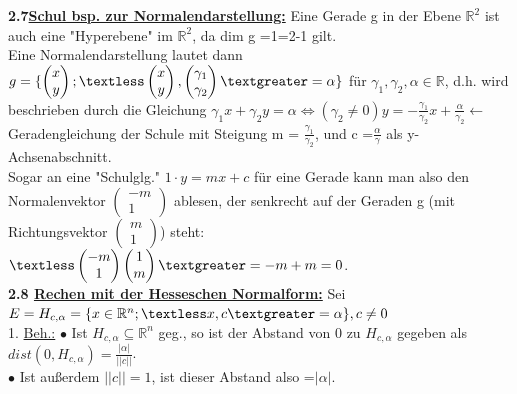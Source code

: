 \documentclass[]{scrartcl}
\begin{document}
\textbf{2.7\underline{Schul bsp. zur Normalendarstellung:}} Eine Gerade g in 
der Ebene $\mathbb{R}^2$ ist auch eine "Hyperebene" im $\mathbb{R}^2$, da dim g 
=1=2-1 gilt.\\
Eine Normalendarstellung lautet dann $g=\{\begin{pmatrix}
		x\\
		y
\end{pmatrix} ;\textless \begin{pmatrix}
x\\
y
\end{pmatrix} ,
\begin{pmatrix}
	\gamma_1\\
	\gamma_2
\end{pmatrix}  \textgreater = \alpha\}$ für $\gamma_1, \gamma_2, \alpha \in \mathbb{R}$, d.h. wird beschrieben durch die Gleichung $\gamma_1 x+ \gamma_2 y = \alpha \Leftrightarrow (\gamma_2 \neq 0) y = -\frac{\gamma_1}{\gamma_2}x + \frac{\alpha}{\gamma_2} \leftarrow$ Geradengleichung der Schule mit Steigung m = $\frac{\gamma_1}{\gamma_2}$, und c =$\frac{\alpha}{\gamma}$ als y-Achsenabschnitt.\\
Sogar an eine "Schulglg." $1\cdot y=mx+c$
 für eine Gerade kann man also den Normalenvektor $\begin{pmatrix}
 	-m\\
 	1
 \end{pmatrix}$ ablesen, der senkrecht auf der Geraden g (mit Richtungsvektor $\begin{pmatrix}
 m\\
 1
 \end{pmatrix}$) steht: $\textless \begin{pmatrix}
 -m\\
 1
 \end{pmatrix}\begin{pmatrix}
 1\\
 m
 \end{pmatrix} \textgreater = -m +m =0$.\\
 \newpage
\textbf{2.8 \underline{Rechen mit der Hesseschen Normalform:}}
 Sei $E= H_{c,\alpha}=\{x\in\mathbb{R}^n;\textless x,c\textgreater=\alpha\}, c\neq0$\\
 1. \underline{Beh.:} $\bullet$ Ist $H_{c,\alpha}\subseteq \mathbb{R}^n$ geg., so ist der Abstand von 0 zu $H_{c,\alpha}$ gegeben als $dist(0,H_{c,\alpha})=\frac{|\alpha|}{||c||}$.\\
 $\bullet$ Ist außerdem $||c||=1$, ist dieser Abstand also =$|\alpha|$.\\
\end{document}
